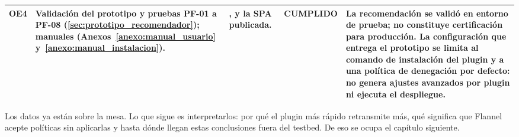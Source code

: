 \begin{table}[htbp]
\begin{tabularx}{\textwidth}{|p{0.9cm}|Y|Y|p{1.6cm}|Y|}
\hline
OE4 & Validación del prototipo y pruebas PF-01 a PF-08 (\cref{sec:prototipo_recomendador}); manuales (Anexos~\ref{anexo:manual_usuario} y~\ref{anexo:manual_instalacion}). & ,  y la SPA publicada. & CUMPLIDO & La recomendación se validó en entorno de prueba; no constituye certificación para producción. La configuración que entrega el prototipo se limita al comando de instalación del plugin y a una política de denegación por defecto: no genera ajustes avanzados por plugin ni ejecuta el despliegue. \\
\hline
\end{tabularx}
\end{table}

Los datos ya están sobre la mesa. Lo que sigue es interpretarlos: por qué el plugin más rápido retransmite más, qué significa que Flannel acepte políticas sin aplicarlas y hasta dónde llegan estas conclusiones fuera del testbed. De eso se ocupa el capítulo siguiente.
